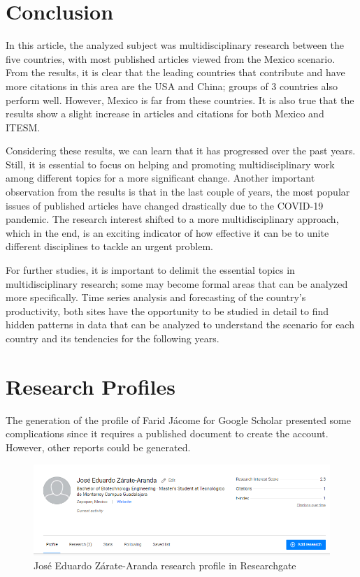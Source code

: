 \documentclass[conference]{IEEEtran}
\begin{document}
\section{Conclusion}
\label{sec:Conclusion}
In this article, the analyzed subject was multidisciplinary research between the five countries, with most published articles viewed from the Mexico scenario. From the results, it is clear that the leading countries that contribute and have more citations in this area are the USA and China; groups of 3 countries also perform well. However, Mexico is far from these countries. It is also true that the results show a slight increase in articles and citations for both Mexico and ITESM. 

Considering these results, we can learn that it has progressed over the past years. Still, it is essential to focus on helping and promoting multidisciplinary work among different topics for a more significant change. Another important observation from the results is that in the last couple of years, the most popular issues of published articles have changed drastically due to the COVID-19 pandemic. The research interest shifted to a more multidisciplinary approach, which in the end, is an exciting indicator of how effective it can be to unite different disciplines to tackle an urgent problem.

For further studies, it is important to delimit the essential topics in multidisciplinary research; some may become formal areas that can be analyzed more specifically. Time series analysis and forecasting of the country's productivity, both sites have the opportunity to be studied in detail to find hidden patterns in data that can be analyzed to understand the scenario for each country and its tendencies for the following years.
\section{Research Profiles}
The generation of the profile of Farid Jácome for Google Scholar presented some complications since it requires a published document to create the account. However, other reports could be generated.

\begin{figure}[H]
    \centering
    \includegraphics[width = 8 cm]{JEDZA1.png}
    \caption{José Eduardo Zárate-Aranda research profile in Researchgate}
    \label{fig:JEDZA1}
\end{figure}
\end{document}
